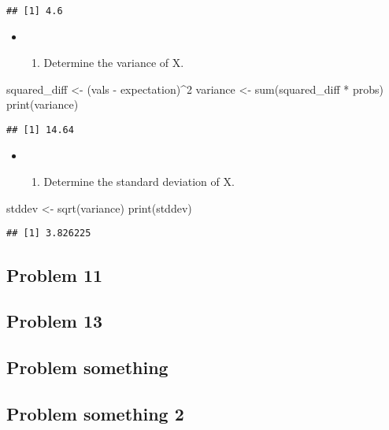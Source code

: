 \documentclass[
]{article}
\newenvironment{Shaded}{\begin{snugshade}}{\end{snugshade}}
\newcommand{\DecValTok}[1]{\textcolor[rgb]{0.00,0.00,0.81}{#1}}
\newcommand{\FunctionTok}[1]{\textcolor[rgb]{0.00,0.00,0.00}{#1}}
\newcommand{\NormalTok}[1]{#1}
\newcommand{\OtherTok}[1]{\textcolor[rgb]{0.56,0.35,0.01}{#1}}
\newcommand{\SpecialCharTok}[1]{\textcolor[rgb]{0.00,0.00,0.00}{#1}}
\providecommand{\tightlist}{%
  \setlength{\itemsep}{0pt}\setlength{\parskip}{0pt}}
\begin{document}
\begin{verbatim}
## [1] 4.6
\end{verbatim}

\hfill\break

\begin{itemize}
\item
  \begin{enumerate}
  \def\labelenumi{\alph{enumi})}
  \setcounter{enumi}{3}
  \tightlist
  \item
    Determine the variance of X.
  \end{enumerate}
\end{itemize}

\begin{Shaded}
\begin{Highlighting}[]
\NormalTok{squared\_diff }\OtherTok{\textless{}{-}}\NormalTok{ (vals }\SpecialCharTok{{-}}\NormalTok{ expectation)}\SpecialCharTok{\^{}}\DecValTok{2}
\NormalTok{variance }\OtherTok{\textless{}{-}} \FunctionTok{sum}\NormalTok{(squared\_diff }\SpecialCharTok{*}\NormalTok{ probs)}
\FunctionTok{print}\NormalTok{(variance)}
\end{Highlighting}
\end{Shaded}

\begin{verbatim}
## [1] 14.64
\end{verbatim}

\hfill\break

\begin{itemize}
\item
  \begin{enumerate}
  \def\labelenumi{\alph{enumi})}
  \setcounter{enumi}{4}
  \tightlist
  \item
    Determine the standard deviation of X.
  \end{enumerate}
\end{itemize}

\begin{Shaded}
\begin{Highlighting}[]
\NormalTok{stddev }\OtherTok{\textless{}{-}} \FunctionTok{sqrt}\NormalTok{(variance)}
\FunctionTok{print}\NormalTok{(stddev)}
\end{Highlighting}
\end{Shaded}

\begin{verbatim}
## [1] 3.826225
\end{verbatim}

\hfill\break

\hypertarget{problem-11}{%
\subsection{Problem 11}\label{problem-11}}

\hypertarget{problem-13}{%
\subsection{Problem 13}\label{problem-13}}

\hypertarget{problem-something}{%
\subsection{Problem something}\label{problem-something}}

\hypertarget{problem-something-2}{%
\subsection{Problem something 2}\label{problem-something-2}}
\end{document}
